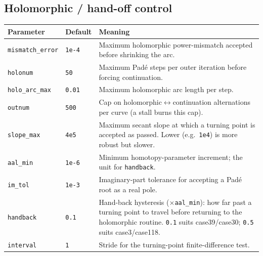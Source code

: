 \documentclass[11pt,a4paper]{article}
\newcommand{\code}[1]{\texttt{#1}}
\begin{document}
\subsection{Holomorphic / hand-off control}
\begin{center}\small
\begin{longtable}{@{}p{}p{}p{}@{}}
\toprule
\textbf{Parameter} & \textbf{Default} & \textbf{Meaning}\\
\midrule\endhead
\code{mismatch_error}& \code{1e-4} & Maximum holomorphic power-mismatch accepted before shrinking the arc.\\
\code{holonum}      & \code{50}   & Maximum Pad\'e steps per outer iteration before forcing continuation.\\
\code{holo_arc_max} & \code{0.01} & Maximum holomorphic arc length per step.\\
\code{outnum}       & \code{500}  & Cap on holomorphic$\leftrightarrow$continuation alternations per curve (a stall burns this cap).\\
\code{slope_max}    & \code{4e5}  & Maximum secant slope at which a turning point is accepted as passed. Lower (e.g.\ \code{1e4}) is more robust but slower.\\
\code{aal_min}      & \code{1e-6} & Minimum homotopy-parameter increment; the unit for \code{handback}.\\
\code{im_tol}       & \code{1e-3} & Imaginary-part tolerance for accepting a Pad\'e root as a real pole.\\
\code{handback}     & \code{0.1}  & Hand-back hysteresis ($\times$\code{aal_min}): how far past a turning point to travel before returning to the holomorphic routine. \code{0.1} suits case39/case30; \code{0.5} suits case3/case118.\\
\code{interval}     & \code{1}    & Stride for the turning-point finite-difference test.\\
\bottomrule
\end{longtable}
\end{center}
\end{document}
